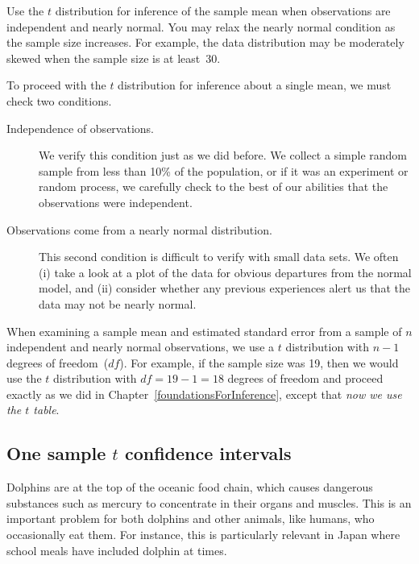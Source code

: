 \begin{tipBox}{
Use the $t$ distribution for inference of the sample mean when observations are independent and nearly normal. You may relax the nearly normal condition as the sample size increases. For example, the data distribution may be moderately skewed when the sample size is at least~30.
}
\end{tipBox}


To proceed with the $t$ distribution for inference about a single mean, we must check two conditions.
\begin{description}
\item[Independence of observations.] We verify this condition just as we did before. We collect a simple random sample from less than 10\% of the population, or if it was an experiment or random process, we carefully check to the best of our abilities that the observations were independent.
\item[Observations come from a nearly normal distribution.] This second condition is difficult to verify with small data sets. We often (i) take a look at a plot of the data for obvious departures from the normal model, and (ii) consider whether any previous experiences alert us that the data may not be nearly normal.
\end{description}
When examining a sample mean and estimated standard error from a sample of $n$ independent and nearly normal observations, we use a $t$ distribution with $n-1$ degrees of freedom~($df$). For example, if the sample size was 19, then we would use the $t$ distribution with $df=19-1=18$ degrees of freedom and proceed exactly as we did in Chapter~\ref{foundationsForInference}, except that \emph{now we use the $t$ table}.


\subsection{One sample $t$ confidence intervals}
\label{oneSampleTConfidenceIntervals}

Dolphins are at the top of the oceanic food chain, which causes dangerous substances such as mercury to concentrate in their organs and muscles. This is an important problem for both dolphins and other animals, like humans, who occasionally eat them. For instance, this is particularly relevant in Japan where school meals have included dolphin at times.
\setlength{\captionwidth}{71.5mm}

